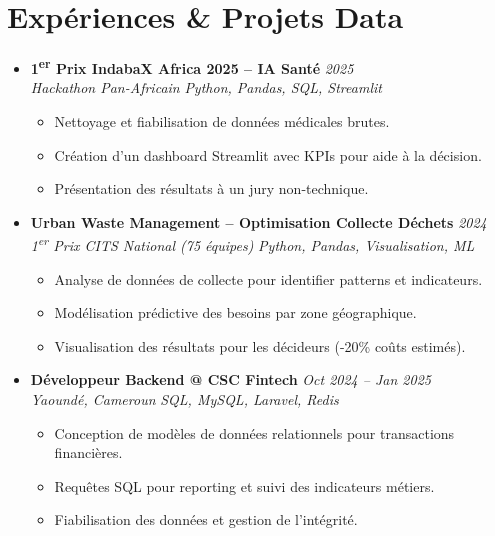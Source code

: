 \documentclass[a4paper,11pt]{article}
\begin{document}
\section{Expériences \& Projets Data}
\begin{itemize}[leftmargin=*, label={-}]

\item \textbf{1\textsuperscript{er} Prix IndabaX Africa 2025 -- IA Santé} \hfill \textit{2025} \\
\textit{Hackathon Pan-Africain} \hfill \textit{Python, Pandas, SQL, Streamlit}
\vspace{-2pt}
    \begin{itemize}[leftmargin=0.4cm, nosep, label=\tiny$\bullet$]
        \item \small{Nettoyage et fiabilisation de données médicales brutes.}
        \item \small{Création d'un dashboard Streamlit avec KPIs pour aide à la décision.}
        \item \small{Présentation des résultats à un jury non-technique.}
    \end{itemize}
\vspace{3pt}

\item \textbf{Urban Waste Management -- Optimisation Collecte Déchets} \hfill \textit{2024} \\
\textit{1\textsuperscript{er} Prix CITS National (75 équipes)} \hfill \textit{Python, Pandas, Visualisation, ML}
\vspace{-2pt}
    \begin{itemize}[leftmargin=0.4cm, nosep, label=\tiny$\bullet$]
        \item \small{Analyse de données de collecte pour identifier patterns et indicateurs.}
        \item \small{Modélisation prédictive des besoins par zone géographique.}
        \item \small{Visualisation des résultats pour les décideurs (-20\% coûts estimés).}
    \end{itemize}
\vspace{3pt}

\item \textbf{Développeur Backend @ CSC Fintech} \hfill \textit{Oct 2024 -- Jan 2025} \\
\textit{Yaoundé, Cameroun} \hfill \textit{SQL, MySQL, Laravel, Redis}
\vspace{-2pt}
    \begin{itemize}[leftmargin=0.4cm, nosep, label=\tiny$\bullet$]
        \item \small{Conception de modèles de données relationnels pour transactions financières.}
        \item \small{Requêtes SQL pour reporting et suivi des indicateurs métiers.}
        \item \small{Fiabilisation des données et gestion de l'intégrité.}
    \end{itemize}
\vspace{3pt}


\end{itemize}
\end{document}
